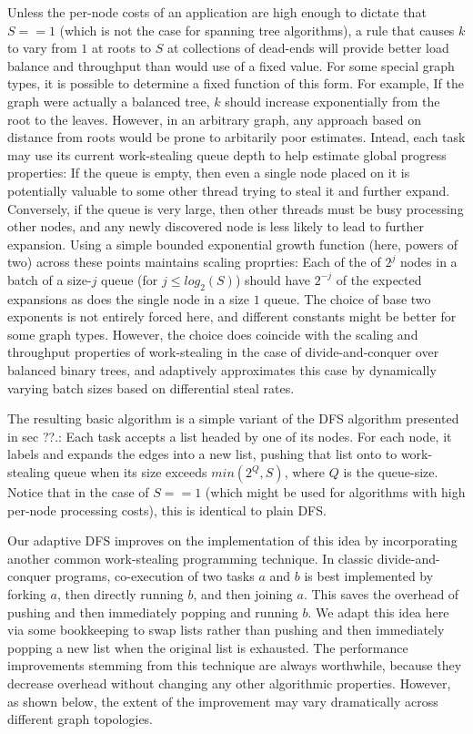 Unless the per-node costs of an application are high enough to dictate
that $S==1$ (which is not the case for spanning tree algorithms), a rule
that causes $k$ to vary from $1$ at roots to $S$ at collections of dead-ends
will provide better load balance and throughput than would use of a
fixed value. For some special graph types, it is possible to determine
a fixed function of this form. For example, If the graph were actually
a balanced tree, $k$ should increase exponentially from the root to the
leaves. However, in an arbitrary graph, any approach based on distance
from roots would be prone to arbitarily poor estimates.  Intead, each
task may use its current work-stealing queue depth to help estimate
global progress properties: If the queue is empty, then even a single
node placed on it is potentially valuable to some other thread trying
to steal it and further expand.  Conversely, if the queue is very
large, then other threads must be busy processing other nodes, and any
newly discovered node is less likely to lead to further expansion.
Using a simple bounded exponential growth function (here, powers of
two) across these points maintains scaling proprties: Each of the of
$2^j$ nodes in a batch of a size-$j$ queue (for $j \leq log_2(S)$) should have
$2^{-j}$ of the expected expansions as does the single node in a size $1$
queue. The choice of base two exponents is not entirely forced here,
and different constants might be better for some graph types.
However, the choice does coincide with the scaling and throughput
properties of work-stealing in the case of divide-and-conquer over
balanced binary trees, and adaptively approximates this case by
dynamically varying batch sizes based on differential steal rates.

The resulting basic algorithm is a simple variant of the DFS algorithm
presented in sec ??.: Each task accepts a list headed by one of its
nodes.  For each node, it labels and expands the edges into a new
list, pushing that list onto to work-stealing queue when its size
exceeds $min(2^{Q}, S)$, where $Q$ is the queue-size. Notice that in
the case of $S==1$ (which might be used for algorithms with high
per-node processing costs), this is identical to plain DFS.

Our adaptive DFS improves on the implementation of this idea by
incorporating another common work-stealing programming technique. In
classic divide-and-conquer programs, co-execution of two tasks $a$ and $b$
is best implemented by forking $a$, then directly running $b$, and then
joining $a$.  This saves the overhead of pushing and then immediately
popping and running $b$.  We adapt this idea here via some bookkeeping
to swap lists rather than pushing and then immediately popping a new
list when the original list is exhausted. The performance improvements
stemming from this technique are always worthwhile, because they
decrease overhead without changing any other algorithmic
properties. However, as shown below, the extent of the improvement may
vary dramatically across different graph topologies.

